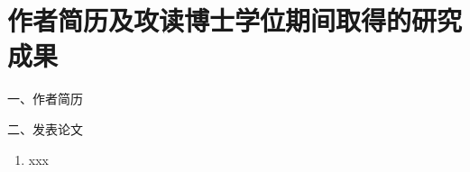 	\chapter*{作者简历及攻读博士学位期间取得的研究成果}
	
一、作者简历

	 

	
 
	
	 
	
	
二、发表论文
	\setlength\leftmargini{3.5em}
	\renewcommand\labelenumi{[\theenumi]}
	\begin{enumerate}
 	\item xxx
	\end{enumerate}

%
